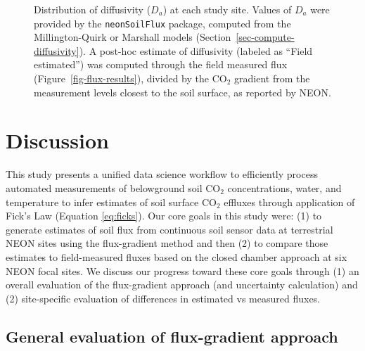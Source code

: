 \documentclass[
  letterpaper,
  DIV=11,
  numbers=noendperiod]{scrartcl}
\begin{document}
\begin{figure}


\caption{\label{fig-diffusivity-plot}Distribution of diffusivity
(\(D_{a}\)) at each study site. Values of \(D_{a}\) were provided by the
\texttt{neonSoilFlux} package, computed from the Millington-Quirk or
Marshall models (Section~\ref{sec-compute-diffusivity}). A post-hoc
estimate of diffusivity (labeled as ``Field estimated'') was computed
through the field measured flux (Figure~\ref{fig-flux-results}), divided
by the CO\(_{2}\) gradient from the measurement levels closest to the
soil surface, as reported by NEON.}

\end{figure}%

\section{Discussion}\label{sec-discussion}

This study presents a unified data science workflow to efficiently
process automated measurements of belowground soil CO\(_{2}\)
concentrations, water, and temperature to infer estimates of soil
surface CO\(_{2}\) effluxes through application of Fick's Law (Equation
\ref{eq:ficks}). Our core goals in this study were: (1) to generate
estimates of soil flux from continuous soil sensor data at terrestrial
NEON sites using the flux-gradient method and then (2) to compare those
estimates to field-measured fluxes based on the closed chamber approach
at six NEON focal sites. We discuss our progress toward these core goals
through (1) an overall evaluation of the flux-gradient approach (and
uncertainty calculation) and (2) site-specific evaluation of differences
in estimated vs measured fluxes.

\subsection{General evaluation of flux-gradient
approach}\label{general-evaluation-of-flux-gradient-approach}
\end{document}
